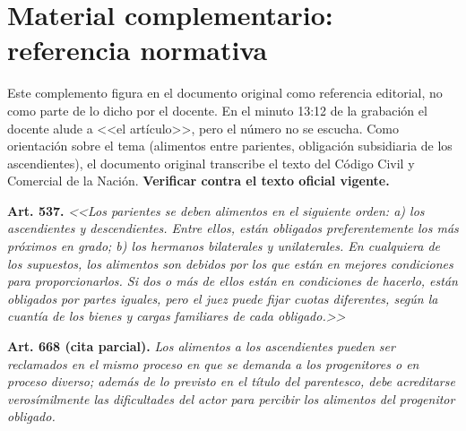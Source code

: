 \documentclass[12pt,oneside]{book}
\begin{document}
\appendix
\chapter{Material complementario: referencia normativa}

\begin{note}
Este complemento figura en el documento original como referencia editorial, no como parte de lo dicho por el docente. En el minuto 13:12 de la grabación el docente alude a <<el artículo>>, pero el número no se escucha. Como orientación sobre el tema (alimentos entre parientes, obligación subsidiaria de los ascendientes), el documento original transcribe el texto del Código Civil y Comercial de la Nación. \textbf{Verificar contra el texto oficial vigente.}
\end{note}

\textbf{Art. 537.} \textit{<<Los parientes se deben alimentos en el siguiente orden: a) los ascendientes y descendientes. Entre ellos, están obligados preferentemente los más próximos en grado; b) los hermanos bilaterales y unilaterales. En cualquiera de los supuestos, los alimentos son debidos por los que están en mejores condiciones para proporcionarlos. Si dos o más de ellos están en condiciones de hacerlo, están obligados por partes iguales, pero el juez puede fijar cuotas diferentes, según la cuantía de los bienes y cargas familiares de cada obligado.>>}

\textbf{Art. 668 (cita parcial).} \textit{Los alimentos a los ascendientes pueden ser reclamados en el mismo proceso en que se demanda a los progenitores o en proceso diverso; además de lo previsto en el título del parentesco, debe acreditarse verosímilmente las dificultades del actor para percibir los alimentos del progenitor obligado.}
\end{document}
